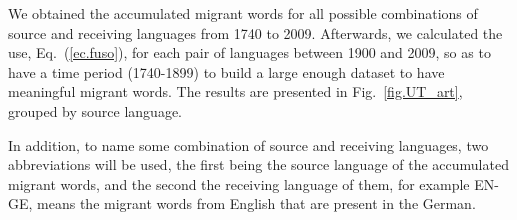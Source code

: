 \documentclass[10pt,letterpaper]{article} %
\newcommand{\eref}[1]{Eq.~(\ref{#1})}
\newcommand{\fref}[1]{Fig.~\ref{#1}}
\begin{document}
We obtained the accumulated migrant words for all possible combinations of
source and receiving languages from 1740 to 2009.  Afterwards, we calculated
the use, \eref{ec.fuso},  for each pair of languages between 1900 and 2009, so
as to have a time period (1740-1899) to build a large enough dataset to have
meaningful migrant words. The results are presented in \fref{fig.UT_art}, 
grouped by source language. 


% 
In addition, to name some combination of source
and receiving languages, two abbreviations will be used, the first being the
source language of the accumulated migrant words, and the second the receiving
language of them, for example EN-GE, means the migrant words from English that
are present in the German.




\end{document}
